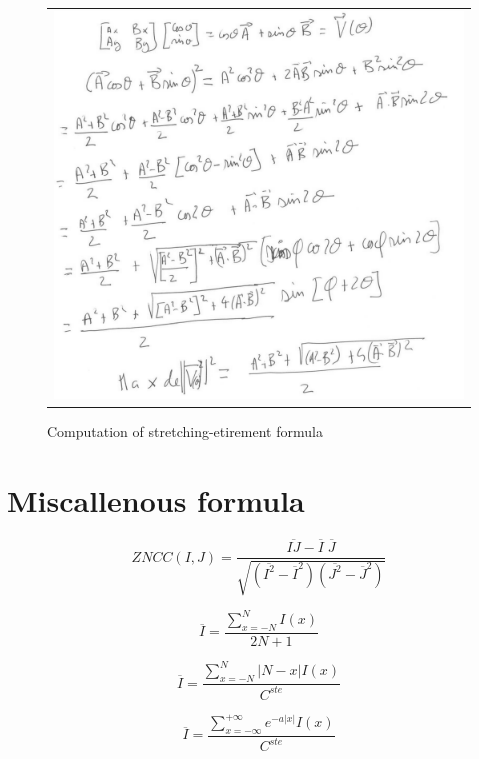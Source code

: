 \begin{figure}
\begin{tabular}{|c|}
   \hline \hline
   \includegraphics[width=160mm]{FIGS/Formules/CalcEtir.JPG}
\end{tabular}
\label{Not:CalcEtir}
\caption{Computation of stretching-etirement formula}
\end{figure}


\section{Miscallenous formula}

\begin{equation}
ZNCC(I,J) = \frac{\overline{IJ}-\overline{I} \; \overline{J} }{\sqrt{(\overline{I^2} -\overline{I}^2)(\overline{J^2} -\overline{J}^2)}}
\end{equation}


\begin{equation}
 \overline{I} = \frac{\sum \limits_{x=-N}^{N}  I(x) } {2N+1}
\end{equation}

\begin{equation}
 \overline{I} = \frac{\sum \limits_{x=-N}^{N}  |N-x|  I(x) } { C^{ste} }
\end{equation}

\begin{equation}
 \overline{I} = \frac{\sum \limits_{x=-\infty}^{+\infty}  e^{-a|x|}  I(x) } { C^{ste} }
\end{equation}


